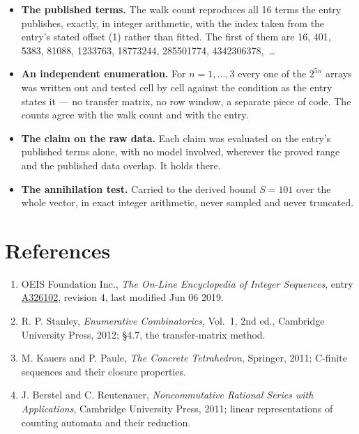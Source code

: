 \documentclass[11pt]{article}
\theoremstyle{definition}
\begin{document}
\begin{itemize}

\item {\bfseries The published terms.} The walk count reproduces all 16 terms the entry publishes, exactly, in integer arithmetic, with the index taken from the entry's stated offset (1) rather than fitted. The first of them are 16, 401, 5383, 81088, 1233763, 18773244, 285501774, 4342306378,~\dots

\item {\bfseries An independent enumeration.} For $n = 1,\dots,3$ every one of the $2^{5n}$ arrays was written out and tested cell by cell against the condition as the entry states it --- no transfer matrix, no row window, a separate piece of code. The counts agree with the walk count and with the entry.

\item {\bfseries The claim on the raw data.} Each claim was evaluated on the entry's published terms alone, with no model involved, wherever the proved range and the published data overlap. It holds there.

\item {\bfseries The annihilation test.} Carried to the derived bound $S = 101$ over the whole vector, in exact integer arithmetic, never sampled and never truncated.

\end{itemize}

\section{References}

\begin{enumerate}

\item OEIS Foundation Inc., \emph{The On-Line Encyclopedia of Integer Sequences}, entry \href{https://oeis.org/A326102}{A326102}, revision 4, last modified Jun 06 2019.

\item R. P. Stanley, \emph{Enumerative Combinatorics}, Vol.~1, 2nd ed., Cambridge University Press, 2012; \S4.7, the transfer-matrix method.

\item M. Kauers and P. Paule, \emph{The Concrete Tetrahedron}, Springer, 2011; C-finite sequences and their closure properties.

\item J. Berstel and C. Reutenauer, \emph{Noncommutative Rational Series with Applications}, Cambridge University Press, 2011; linear representations of counting automata and their reduction.

\end{enumerate}
\end{document}
